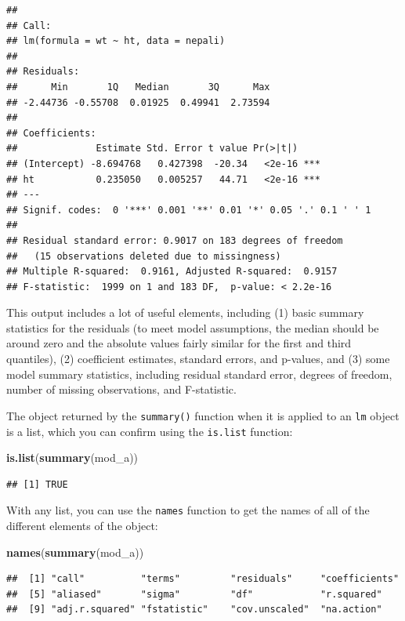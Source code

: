\documentclass[]{book}
\makeatletter
\newenvironment{Shaded}{\begin{snugshade}}{\end{snugshade}}
\newcommand{\KeywordTok}[1]{\textcolor[rgb]{0.13,0.29,0.53}{\textbf{#1}}}
\newcommand{\NormalTok}[1]{#1}
\newenvironment{kframe}{%
\medskip{}
\setlength{\fboxsep}{.8em}
 \def\at@end@of@kframe{}%
 \ifinner\ifhmode%
  \def\at@end@of@kframe{\end{minipage}}%
  \begin{minipage}{\columnwidth}%
 \fi\fi%
 \def\FrameCommand##1{\hskip\@totalleftmargin \hskip-\fboxsep
 \colorbox{shadecolor}{##1}\hskip-\fboxsep
     \hskip-\linewidth \hskip-\@totalleftmargin \hskip\columnwidth}%
 \MakeFramed {\advance\hsize-\width
   \@totalleftmargin\z@ \linewidth\hsize
   \@setminipage}}%
 {\par\unskip\endMakeFramed%
 \at@end@of@kframe}
\renewenvironment{Shaded}{\begin{kframe}}{\end{kframe}}
\theoremstyle{definition}
\theoremstyle{definition}
\theoremstyle{definition}
\theoremstyle{remark}
\makeatother
\begin{document}
\begin{verbatim}
## 
## Call:
## lm(formula = wt ~ ht, data = nepali)
## 
## Residuals:
##      Min       1Q   Median       3Q      Max 
## -2.44736 -0.55708  0.01925  0.49941  2.73594 
## 
## Coefficients:
##              Estimate Std. Error t value Pr(>|t|)    
## (Intercept) -8.694768   0.427398  -20.34   <2e-16 ***
## ht           0.235050   0.005257   44.71   <2e-16 ***
## ---
## Signif. codes:  0 '***' 0.001 '**' 0.01 '*' 0.05 '.' 0.1 ' ' 1
## 
## Residual standard error: 0.9017 on 183 degrees of freedom
##   (15 observations deleted due to missingness)
## Multiple R-squared:  0.9161, Adjusted R-squared:  0.9157 
## F-statistic:  1999 on 1 and 183 DF,  p-value: < 2.2e-16
\end{verbatim}

This output includes a lot of useful elements, including (1) basic
summary statistics for the residuals (to meet model assumptions, the
median should be around zero and the absolute values fairly similar for
the first and third quantiles), (2) coefficient estimates, standard
errors, and p-values, and (3) some model summary statistics, including
residual standard error, degrees of freedom, number of missing
observations, and F-statistic.

The object returned by the \texttt{summary()} function when it is
applied to an \texttt{lm} object is a list, which you can confirm using
the \texttt{is.list} function:

\begin{Shaded}
\begin{Highlighting}[]
\KeywordTok{is.list}\NormalTok{(}\KeywordTok{summary}\NormalTok{(mod_a))}
\end{Highlighting}
\end{Shaded}

\begin{verbatim}
## [1] TRUE
\end{verbatim}

With any list, you can use the \texttt{names} function to get the names
of all of the different elements of the object:

\begin{Shaded}
\begin{Highlighting}[]
\KeywordTok{names}\NormalTok{(}\KeywordTok{summary}\NormalTok{(mod_a))}
\end{Highlighting}
\end{Shaded}

\begin{verbatim}
##  [1] "call"          "terms"         "residuals"     "coefficients" 
##  [5] "aliased"       "sigma"         "df"            "r.squared"    
##  [9] "adj.r.squared" "fstatistic"    "cov.unscaled"  "na.action"
\end{verbatim}
\end{document}
